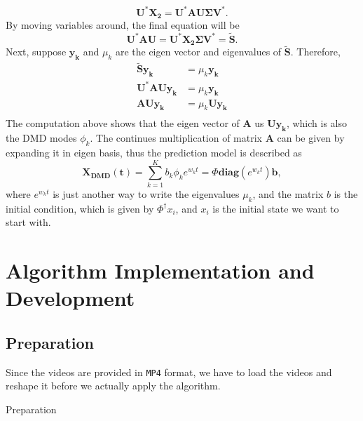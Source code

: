 \documentclass{article}
\begin{document}
\[
\mathbf{U^*X_2} = \mathbf{U^*AU\Sigma V^*}.
\]
By moving variables around, the final equation will be
\[
\mathbf{U^*AU} = \mathbf{U^*X_2\Sigma V^*=\tilde{S}}.
\]
Next, suppose $\mathbf{y_k}$ and $\mu_k$ are the eigen vector and eigenvalues of $\mathbf{\tilde{S}}$. Therefore, 
\begin{equation}
    \begin{aligned}
    \mathbf{\tilde{S}y_k} &= \mu_k \mathbf{y_k} \\
    \mathbf{U^*AUy_k} &=  \mu_k \mathbf{y_k} \\
    \mathbf{AUy_k} &=  \mu_k \mathbf{Uy_k} \\
    \end{aligned}
\end{equation}
The computation above shows that the eigen vector of $\mathbf{A}$ us $\mathbf{Uy_k}$, which is also the DMD modes $\phi_k$. The continues multiplication of matrix $\mathbf{A}$ can be given by expanding it in eigen basis, thus the prediction model is described as
\[
\mathbf{X_{DMD}(t)} = \sum_{k=1}^K b_k \phi_k e^{w_k t} = \Phi \textbf{diag} (e^{w_k t}) \mathbf{b},
\]
where $e^{w_k t}$ is just another way to write the eigenvalues $\mu_k$, and the matrix $b$ is the initial condition, which is given by $\Phi^\dagger x_i$, and $x_i$ is the initial state we want to start with.
\section{Algorithm Implementation and Development}
\subsection{Preparation}
Since the videos are provided in \texttt{MP4} format, we have to load the videos and reshape it before we actually apply the algorithm.
\begin{algorithm}
\begin{algorithmic}
    \ENDFOR
\end{algorithmic}
\caption{Preparation}
\end{algorithm}
\end{document}
